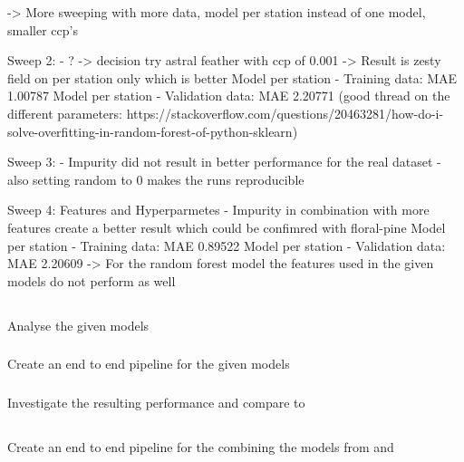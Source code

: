 \documentclass[a4paper]{article}
\begin{document}
    -> More sweeping with more data, model per station instead of one model, smaller ccp's

    Sweep 2:
    - ?
    -> decision try astral feather with ccp of 0.001
    -> Result is zesty field on per station only which is better
    Model per station - Training data: MAE 1.00787
    Model per station - Validation data: MAE 2.20771
    (good thread on the different parameters: https://stackoverflow.com/questions/20463281/how-do-i-solve-overfitting-in-random-forest-of-python-sklearn)

    Sweep 3:
    - Impurity did not result in better performance for the real dataset
    - also setting random to 0 makes the runs reproducible

    Sweep 4: Features and Hyperparmetes
    - Impurity in combination with more features create a better result which could be confimred with floral-pine
    Model per station - Training data: MAE 0.89522
    Model per station - Validation data: MAE 2.20609
    -> For the random forest model the features used in the given models do not perform as well

    \subsection*{}
    \subsubsection*{} Analyse the given models
    \subsubsection*{} Create an end to end pipeline for the given models
    \subsubsection*{} Investigate the resulting performance and compare to 

    \subsection*{}
    \subsubsection*{} Create an end to end pipeline for the combining the models from  and 
\end{document}
